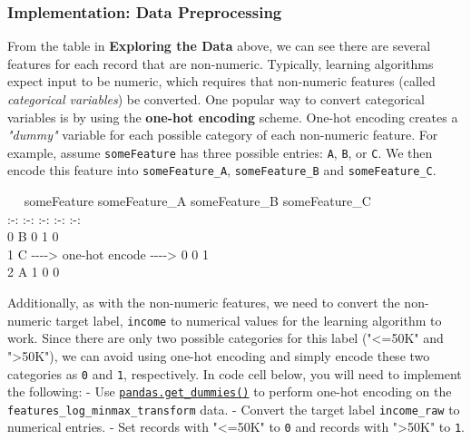 \documentclass[11pt]{article}
\begin{document}
    
    \subsubsection{Implementation: Data
Preprocessing}\label{implementation-data-preprocessing}

From the table in \textbf{Exploring the Data} above, we can see there
are several features for each record that are non-numeric. Typically,
learning algorithms expect input to be numeric, which requires that
non-numeric features (called \emph{categorical variables}) be converted.
One popular way to convert categorical variables is by using the
\textbf{one-hot encoding} scheme. One-hot encoding creates a
\emph{"dummy"} variable for each possible category of each non-numeric
feature. For example, assume \texttt{someFeature} has three possible
entries: \texttt{A}, \texttt{B}, or \texttt{C}. We then encode this
feature into \texttt{someFeature\_A}, \texttt{someFeature\_B} and
\texttt{someFeature\_C}.

~~\textbar{} someFeature \textbar{} \textbar{} someFeature\_A \textbar{}
someFeature\_B \textbar{} someFeature\_C \textbar{}\\
:-: \textbar{} :-: \textbar{} \textbar{} :-: \textbar{} :-: \textbar{}
:-: \textbar{}\\
0 \textbar{} B \textbar{} \textbar{} 0 \textbar{} 1 \textbar{} 0
\textbar{}\\
1 \textbar{} C \textbar{} -\/-\/-\/-\textgreater{} one-hot encode
-\/-\/-\/-\textgreater{} \textbar{} 0 \textbar{} 0 \textbar{} 1
\textbar{}\\
2 \textbar{} A \textbar{} \textbar{} 1 \textbar{} 0 \textbar{} 0
\textbar{}

Additionally, as with the non-numeric features, we need to convert the
non-numeric target label,
\texttt{\textquotesingle{}income\textquotesingle{}} to numerical values
for the learning algorithm to work. Since there are only two possible
categories for this label ("\textless{}=50K" and "\textgreater{}50K"),
we can avoid using one-hot encoding and simply encode these two
categories as \texttt{0} and \texttt{1}, respectively. In code cell
below, you will need to implement the following: - Use
\href{http://pandas.pydata.org/pandas-docs/stable/generated/pandas.get_dummies.html?highlight=get_dummies\#pandas.get_dummies}{\texttt{pandas.get\_dummies()}}
to perform one-hot encoding on the
\texttt{\textquotesingle{}features\_log\_minmax\_transform\textquotesingle{}}
data. - Convert the target label
\texttt{\textquotesingle{}income\_raw\textquotesingle{}} to numerical
entries. - Set records with "\textless{}=50K" to \texttt{0} and records
with "\textgreater{}50K" to \texttt{1}.
\end{document}
